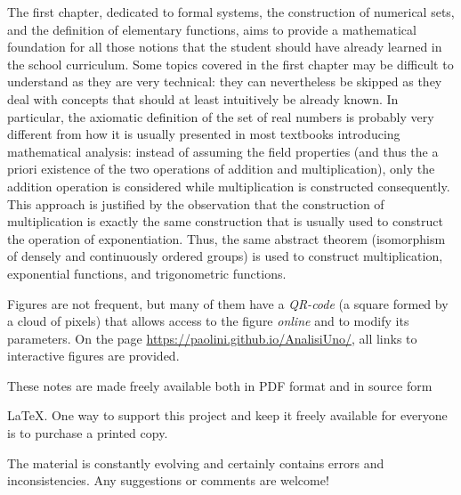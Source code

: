 The first chapter, dedicated to formal systems, the construction of numerical %
sets, and the definition of elementary functions, aims to provide a mathematical %
foundation for all those notions that the student should have already learned in %
the school curriculum. Some topics covered in the first chapter may be difficult %
to understand as they are very technical: they can nevertheless be skipped as %
they deal with concepts that should at least intuitively be already known. In %
particular, the axiomatic definition of the set of real numbers is probably very %
different from how it is usually presented in most textbooks introducing %
mathematical analysis: instead of assuming the field properties (and thus the a %
priori existence of the two operations of addition and multiplication), only the %
addition operation is considered while multiplication is constructed %
consequently. This approach is justified by the observation that the %
construction of multiplication is exactly the same construction that is usually %
used to construct the operation of exponentiation. Thus, the same abstract %
theorem (isomorphism of densely and continuously ordered groups) is used to %
construct multiplication, exponential functions, and trigonometric functions. %

Figures are not frequent, but many of them have a \emph{QR-code} (a square %
formed by a cloud of pixels) that allows access to the figure \emph{online} and %
to modify its parameters. 
On the page \url{https://paolini.github.io/AnalisiUno/}, 
all links to interactive figures
are provided.

These notes are made freely available both in PDF format and in source form %

\LaTeX{}. 
One way to support this project and keep it freely available for %
everyone is to purchase a printed copy. %

The material is constantly evolving and certainly contains errors and %
inconsistencies. Any suggestions or comments are welcome! %

